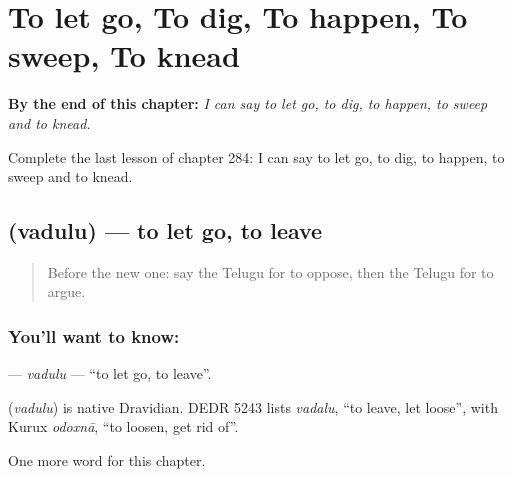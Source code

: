
\chapter{To let go, To dig, To happen, To sweep, To knead}
\label{ch:te-to-let-go-to-dig-to-happen-to-sweep-to-knead}

\begin{chapteropening}
\textbf{By the end of this chapter:} \emph{I can say to let go, to dig, to happen, to sweep and to knead.}

Complete the last lesson of chapter 284: I can say to let go, to dig, to happen, to sweep and to knead.
\end{chapteropening}

\section[\texorpdfstring{\te{వదులు} (vadulu)}{వదులు (vadulu)}]{ (vadulu) — to let go, to leave}

\label{lesson:TE-C284-vadulu}



\begin{quote}
Before the new one: say the Telugu for to oppose, then the Telugu for to argue.
\end{quote}

\subsection*{You'll want to know: }
\textbf{} — \emph{vadulu} — \textquotedblleft{}to let go, to leave\textquotedblright{}.

\begin{cousinweb}
\textbf{} (\emph{vadulu}) is native Dravidian. DEDR 5243 lists \emph{vadalu}, \textquotedblleft{}to leave, let loose\textquotedblright{}, with Kurux \emph{odoxnā}, \textquotedblleft{}to loosen, get rid of\textquotedblright{}.
\end{cousinweb}

\begin{grammarlens}[title={What you've built}]
One more word for this chapter.
\end{grammarlens}


